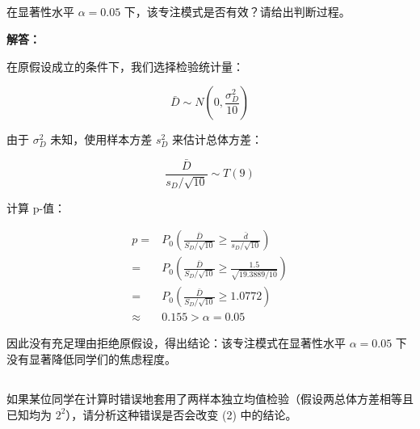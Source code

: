 \documentclass[12pt,a4paper]{article}
\begin{document}
\subsection{}

在显著性水平 $\alpha=0.05$ 下，该专注模式是否有效？请给出判断过程。

\begin{answerbox}
\textbf{解答：}

在原假设成立的条件下，我们选择检验统计量：

$$
\bar{D} \sim N\left(0, \frac{\sigma_D^2}{10}\right)
$$

由于 $\sigma_D^2$ 未知，使用样本方差 $s_D^2$ 来估计总体方差：

$$
\frac{\bar{D}}{s_D/\sqrt{10}} \sim T(9)
$$

计算 p-值：

$$
\begin{aligned}
p=& P_{0}\left(\frac{\bar{D}}{S_D/\sqrt{10}} \geq \frac{\bar{d}}{s_D/\sqrt{10}}\right) \\
=& P_{0}\left(\frac{\bar{D}}{S_D/\sqrt{10}} \geq \frac{1.5}{\sqrt{19.3889/10}}\right) \\
=& P_{0}\left(\frac{\bar{D}}{S_D/\sqrt{10}} \geq 1.0772\right) \\
\approx& 0.155 > \alpha = 0.05
\end{aligned}
$$

因此没有充足理由拒绝原假设，得出结论：该专注模式在显著性水平 $\alpha=0.05$ 下没有显著降低同学们的焦虑程度。
\end{answerbox}

\subsection{}

如果某位同学在计算时错误地套用了两样本独立均值检验（假设两总体方差相等且已知均为 $2^2$），请分析这种错误是否会改变 (2) 中的结论。
\end{document}
